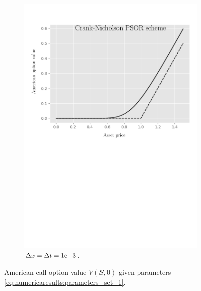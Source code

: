 \begin{figure}[H]
\begin{subfigure}{0.4\textwidth}
    \includegraphics[width=\textwidth]{chapters/chapter5/TestCase1CrankNicholsonLCP.pdf}
    \caption{$\Delta{x}=\Delta{t}={1}\mathrm{e}{-3}$.}
  \end{subfigure}
  \caption{American call option value $V(S, 0)$ given parameters \eqref{eq:numericaresults:parameters_set_1}.}
  \label{fig:lcp:numericaresults:numericaresults:test_case_1}
\end{figure}
